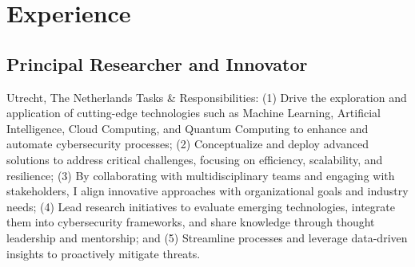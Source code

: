 \documentclass[print]{styles/friggeri-cv-mac} %
\begin{document}
\section{Experience}\vspace{-5pt}
\subsection{Principal Researcher and Innovator}\vspace{-5pt}
\begin{entrylist}
	{Utrecht, The Netherlands}
	{Tasks \& Responsibilities: (1) Drive the exploration and application of cutting-edge technologies such as Machine Learning, Artificial Intelligence, Cloud Computing, and Quantum Computing to enhance and automate cybersecurity processes; (2) Conceptualize and deploy advanced solutions to address critical challenges, focusing on efficiency, scalability, and resilience; (3) By collaborating with multidisciplinary teams and engaging with stakeholders, I align innovative approaches with organizational goals and industry needs; (4) Lead research initiatives to evaluate emerging technologies, integrate them into cybersecurity frameworks, and share knowledge through thought leadership and mentorship; and (5) Streamline processes and leverage data-driven insights to proactively mitigate threats.}
\end{entrylist}

\end{document}
